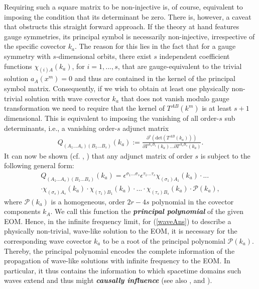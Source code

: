 \documentclass[%
 reprint,
nofootinbib,
 amsmath,amssymb,
 aps,
 prd,
floatfix,
]{revtex4-2}
\begin{document}
Requiring such a square matrix to be non-injective is, of course, equivalent to imposing the condition that its determinant be zero. There is, however, a caveat that obstructs this straight forward approach. If the theory at hand features gauge symmetries, its principal symbol is necessarily non-injective, irrespective of the specific covector $k_a$. 
The reason for this lies in the fact that for a gauge symmetry with $s$-dimensional orbits, there exist $s$ independent coefficient functions $\chi_{(i)A}(k_a)$, for $i = 1,...,s$, that are gauge-equivalent to the trivial solution $a_A(x^m)=0$ and thus are contained in the kernel of the principal symbol matrix. 
Consequently, if we wish to obtain at least one physically non-trivial solution with wave covector $k_a$ that does not vanish modulo gauge transformation we need to require that the kernel of $T^{AB}(k^m)$ is at least $s+1$ dimensional. This is equivalent to imposing the vanishing of all order-$s$ sub determinants, i.e., a vanishing order-$s$ adjunct matrix
\begin{align}
    Q_{(A_1...A_s) (B_1...B_s)}(k_a) := \frac{\partial^s (\mathrm{det}(T^{AB}(k_a)))}{\partial T^{A_1 B_1}(k_a) ... \partial T^{A_s B_s}(k_a)}.
\end{align}  
It can now be shown (cf. \cite{2018PhRvD..97h4036D}, \cite{2009JPhA...42U5402I}) that any adjunct matrix of order $s$ is subject to the following general form:
\begin{multline}
    Q_{(A_1...A_s) (B_1...B_s)}(k_a) = \epsilon^{\sigma_1...\sigma_s} \epsilon^{\tau_1...\tau_s} \chi_{(\sigma_1)A_1}(k_a) \cdot ... \\
    \cdot \chi_{(\sigma_s)A_s}(k_a) \cdot \chi_{(\tau_1)B_1}(k_a) \cdot ... \cdot \chi_{(\tau_s)B_s}(k_a) \cdot \mathcal{P}(k_a),
\end{multline}
where $\mathcal{P}(k_a)$ is a homogeneous, order $2r-4s$ polynomial in the covector components $k_A$. We call this function the \textit{\textbf{principal polynomial}} of the given EOM.
Hence, in the infinite frequency limit, for (\ref{waveAns}) to describe a physically non-trivial, wave-like solution to the EOM, it is necessary for the corresponding wave covector $k_a$ to be a root of the principal polynomial $\mathcal{P}(k_a)$. 
Thereby, the principal polynomial encodes the complete information of the propagation of wave-like solutions with infinite frequency to the EOM. In particular, it thus contains the information to which spacetime domains such waves extend and thus might \textit{\textbf{causally influence}} (see also \cite{2012arXiv1211.1914K}, \cite{seiler2009involution} and \cite{2011PhRvD..83d4047R}).
\end{document}

